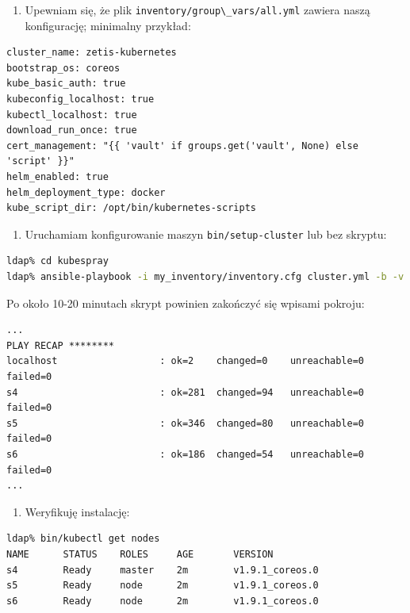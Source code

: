 \documentclass[a4paper,12pt,twoside,openany]{report}
\providecommand{\tightlist}{%
  \setlength{\itemsep}{0pt}\setlength{\parskip}{0pt}}
\newcommand{\passthrough}[1]{#1}
\begin{document}
\begin{enumerate}
\def\labelenumi{\arabic{enumi}.}
\setcounter{enumi}{6}
\tightlist
\item
  Upewniam się, że plik
  \passthrough{\lstinline!inventory/group\_vars/all.yml!} zawiera naszą
  konfigurację; minimalny przykład:
\end{enumerate}

\begin{lstlisting}
cluster_name: zetis-kubernetes
bootstrap_os: coreos
kube_basic_auth: true
kubeconfig_localhost: true
kubectl_localhost: true
download_run_once: true
cert_management: "{{ 'vault' if groups.get('vault', None) else 'script' }}"
helm_enabled: true
helm_deployment_type: docker
kube_script_dir: /opt/bin/kubernetes-scripts
\end{lstlisting}

\begin{enumerate}
\def\labelenumi{\arabic{enumi}.}
\setcounter{enumi}{7}
\tightlist
\item
  Uruchamiam konfigurowanie maszyn
  \passthrough{\lstinline!bin/setup-cluster!} lub bez skryptu:
\end{enumerate}

\begin{lstlisting}[language=bash]
ldap% cd kubespray
ldap% ansible-playbook -i my_inventory/inventory.cfg cluster.yml -b -v
\end{lstlisting}

Po około 10-20 minutach skrypt powinien zakończyć się wpisami pokroju:

\begin{lstlisting}
...
PLAY RECAP ********
localhost                  : ok=2    changed=0    unreachable=0    failed=0   
s4                         : ok=281  changed=94   unreachable=0    failed=0   
s5                         : ok=346  changed=80   unreachable=0    failed=0   
s6                         : ok=186  changed=54   unreachable=0    failed=0   
...
\end{lstlisting}

\begin{enumerate}
\def\labelenumi{\arabic{enumi}.}
\setcounter{enumi}{8}
\tightlist
\item
  Weryfikuję instalację:
\end{enumerate}

\begin{lstlisting}[language=bash]
ldap% bin/kubectl get nodes
NAME      STATUS    ROLES     AGE       VERSION
s4        Ready     master    2m        v1.9.1_coreos.0
s5        Ready     node      2m        v1.9.1_coreos.0
s6        Ready     node      2m        v1.9.1_coreos.0
\end{lstlisting}
\end{document}
